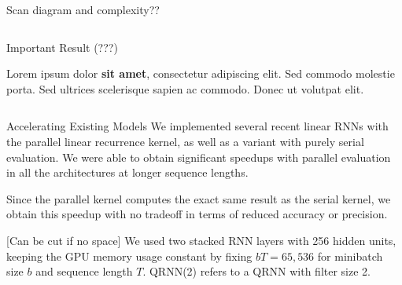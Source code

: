 \documentclass[final]{beamer}
\newlength{\onecolwid}
\newlength{\twocolwid}
\begin{document}
\begin{frame}[t]
\begin{columns}[t]
\begin{column}{\twocolwid}
\begin{columns}[t,totalwidth=\twocolwid]
\begin{column}{\onecolwid}
\begin{block}{Scan diagram and complexity??}
\end{block}


\end{column} %

\end{columns} %


\begin{alertblock}{Important Result (???)}

Lorem ipsum dolor \textbf{sit amet}, consectetur adipiscing elit. Sed commodo molestie porta. Sed ultrices scelerisque sapien ac commodo. Donec ut volutpat elit.

\end{alertblock}


\begin{columns}[t,totalwidth=\twocolwid] %

\begin{column}{\onecolwid} %


\begin{block}{Accelerating Existing Models}
  We implemented several recent linear RNNs with the parallel linear
  recurrence kernel, as well as a variant with purely serial evaluation.
  We were able to obtain significant speedups with parallel evaluation
  in all the architectures at longer sequence lengths.

  Since the parallel kernel computes the exact same result as the
  serial kernel, we obtain this speedup with no tradeoff in terms of
  reduced accuracy or precision.

  [Can be cut if no space]
  We used two stacked RNN layers with 256 hidden
  units, keeping the GPU memory usage constant by fixing $bT = 65,536$
  for minibatch size $b$ and sequence length $T$. QRNN(2) refers to a
  QRNN with filter size 2. %


\end{block}
\end{column}
\end{columns}
\end{column}
\end{columns}
\end{frame}
\end{document}
